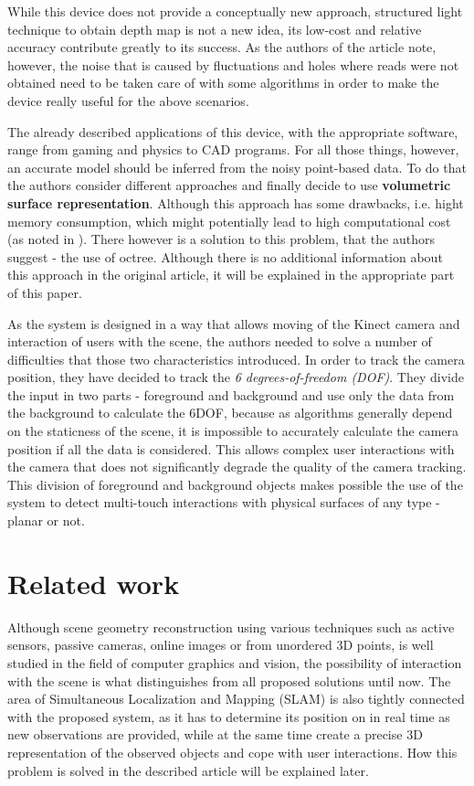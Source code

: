 \documentclass[12pt]{article}
\theoremstyle{plain}
\begin{document}
  While this device does not provide a conceptually new approach, structured
  light technique to obtain depth map is not a new idea, its low-cost and
  relative accuracy contribute greatly to its success. As the authors of the
  article note, however, the noise that is caused by fluctuations and holes
  where reads were not obtained need to be taken care of with some algorithms in
  order to make the device really useful for the above scenarios. 

  The already described applications of this device, with the appropriate
  software, range from gaming and physics to CAD programs. For all those things,
  however, an accurate model should be inferred from the noisy point-based data.
  To do that the authors consider different approaches and finally decide to use 
  \textbf{volumetric surface representation}. Although this approach has some 
  drawbacks, i.e. hight memory consumption, which might potentially lead to high
  computational cost (as noted in
  \cite{representaion-and-rendering-of-implicit-surfaces}). There however is a
  solution to this problem, that the authors suggest - the use of octree.
  Although there is no additional information about this approach in the
  original article, it will be explained in the appropriate part of this paper. 

  As the system is designed in a way that allows moving of the Kinect camera and
  interaction of users with the scene, the authors needed to solve a number of
  difficulties that those two characteristics introduced. In order to track the
  camera position, they have decided to track the \emph{6 degrees-of-freedom
  (DOF)}. They divide the input in two parts - foreground and background and use
  only the data from the background to calculate the 6DOF, because as algorithms
  generally depend on the staticness of the scene, it is impossible to
  accurately calculate the camera position if all the data is considered. This
  allows complex user interactions with the camera that does not significantly
  degrade the quality of the camera tracking. This division of foreground and
  background objects makes possible the use of the system to detect multi-touch
  interactions with physical surfaces of any type - planar or not.


\section{Related work} %
\label{sec:Related work}
  Although scene geometry reconstruction using various techniques such as active
  sensors, passive cameras, online images or from unordered 3D points, is well
  studied in the field of computer graphics and vision, the possibility of
  interaction with the scene is what distinguishes \cite{kinectfusion} from all
  proposed solutions until now. The area of Simultaneous Localization and
  Mapping (SLAM) is also tightly connected with the proposed system, as it has
  to determine its position on in real time as new observations are provided,
  while at the same time create a precise 3D representation of the observed
  objects and cope with user interactions. How this problem is solved in the
  described article will be explained later.
\end{document}
